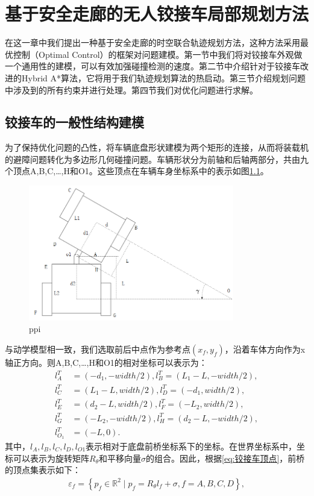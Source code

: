 \documentclass[master,academic]{ysuthesis} %
\begin{document}
	\chapter{基于安全走廊的无人铰接车局部规划方法}
	在这一章中我们提出一种基于安全走廊的时空联合轨迹规划方法，这种方法采用最优控制（Optimal Control）的框架对问题建模。第一节中我们将对铰接车外观做一个通用性的建模，可以有效加强碰撞检测的速度。第二节中介绍针对于铰接车改进的Hybrid A*算法，它将用于我们轨迹规划算法的热启动。第三节介绍规划问题中涉及到的所有约束并进行处理。第四节我们对优化问题进行求解。
	\section{铰接车的一般性结构建模}
	为了保持优化问题的凸性，将车辆底盘形状建模为两个矩形的连接，从而将装载机的避障问题转化为多边形几何碰撞问题。车辆形状分为前轴和后轴两部分，共由九个顶点A,B,C,…,H和O1。这些顶点在车辆车身坐标系中的表示如图\ref{fig:铰接车外观结构建模}。
	\begin{figure}[!ht]
		\centering
		\includegraphics[width=0.8\textwidth]{ppi.png}
		\caption{ppi}
		\label{fig:铰接车外观结构建模}
	\end{figure}

	与动学模型相一致，我们选取前后中点作为参考点$(x_f,y_f)$，沿着车体方向作为x轴正方向。则A,B,C,…,H和O1的相对坐标可以表示为：
	\begin{equation}
		\begin{aligned}
			l_{A}^{T}&=( -d_1,-width/2 ) ,l_{B}^{T}=( L_1-L,-width/2 ) ,\\
			l_{C}^{T}&=( L_1-L,width/2 ) ,l_{D}^{T}=( -d_1,width/2 ) ,\\
			l_{E}^{T}&=( d_2-L,width/2 ) ,l_{F}^{T}=( -L_2,width/2 ) ,\\
			l_{G}^{T}&=( -L_2,-width/2 ) ,l_{H}^{T}=( d_2-L,-width/2 ) ,\\
			l_{O_1}^{T}&=( -L,0 ) .
		\end{aligned}
		\label{eq:铰接车顶点}
	\end{equation}
	其中，$l_A,l_B,l_C,l_D,l_{O1}$表示相对于底盘前桥坐标系下的坐标。在世界坐标系中，坐标可以表示为旋转矩阵$R_\theta$和平移向量$\sigma$的组合。因此，根据\ref{eq:铰接车顶点}，前桥的顶点集表示如下：
	\begin{equation}
	\begin{aligned}
		\varepsilon_f = \left\{ p_f \in \mathbb{R}^2 \mid p_f=R_\theta l_f+\sigma,  f = A,B,C,D \right\},
	\end{aligned} 
	\end{equation}
	
\end{document}
